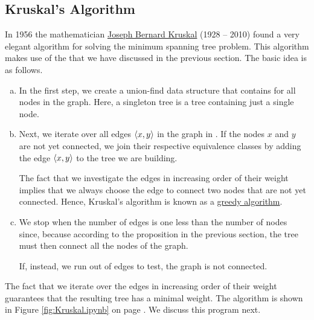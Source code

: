 \subsection{Kruskal's Algorithm}
In 1956 the mathematician \href{https://en.wikipedia.org/wiki/Joseph_Kruskal}{Joseph Bernard Kruskal} (1928 -- 2010) 
found a very elegant algorithm for solving the minimum spanning tree problem.   This algorithm makes use
of the  that we have discussed in the previous section.  The basic idea is as
follows.
\begin{enumerate}[(a)]
\item In the first step, we create a union-find data structure that contains 
      for all nodes in the graph.  Here, a singleton tree is a tree containing just a single node.
\item Next, we iterate over all edges $\pair(x, y)$ in the graph in .
      If the nodes $x$ and $y$ are not yet connected, we join their respective equivalence classes by adding
      the edge $\pair(x, y)$ to the tree we are building.

      The fact that we investigate the edges in increasing order of their weight implies that we always choose
      the  edge to connect two nodes that are not yet connected.  Hence, Kruskal's algorithm is
      known as a \href{https://en.wikipedia.org/wiki/Greedy_algorithm}{greedy algorithm}.
\item We stop when the number of edges is one less than the number of nodes since, because according to the
      proposition in the previous section, the tree must then connect all the nodes of the graph.

      If, instead, we run out of edges to test, the graph is not connected.
\end{enumerate}
The fact that we iterate over the edges in increasing order of their weight guarantees that the
resulting tree has a minimal weight.
The algorithm is shown in Figure \ref{fig:Kruskal.ipynb} on page \pageref{fig:Kruskal.ipynb}.  We
discuss this program next.

